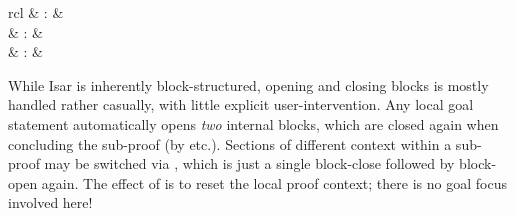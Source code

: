 \begin{isabellebody}
\begin{isamarkuptext}
\begin{description}
  \end{description}%
\end{isamarkuptext}%
\isamarkuptrue%
%
\isamarkuptrue%
%
\begin{isamarkuptext}%
\begin{matharray}{rcl}
    \hypertarget{command.next}{\hyperlink{command.next}{\mbox{}}} & : &  \\
    \hypertarget{command.braceleft}{\hyperlink{command.braceleft}{\mbox{}}} & : &  \\
    \hypertarget{command.braceright}{\hyperlink{command.braceright}{\mbox{}}} & : &  \\
  \end{matharray}

  While Isar is inherently block-structured, opening and closing
  blocks is mostly handled rather casually, with little explicit
  user-intervention.  Any local goal statement automatically opens
  \emph{two} internal blocks, which are closed again when concluding
  the sub-proof (by \hyperlink{command.qed}{\mbox{}} etc.).  Sections of different
  context within a sub-proof may be switched via \hyperlink{command.next}{\mbox{}},
  which is just a single block-close followed by block-open again.
  The effect of \hyperlink{command.next}{\mbox{}} is to reset the local proof context;
  there is no goal focus involved here!


\end{isamarkuptext}
\end{isabellebody}
